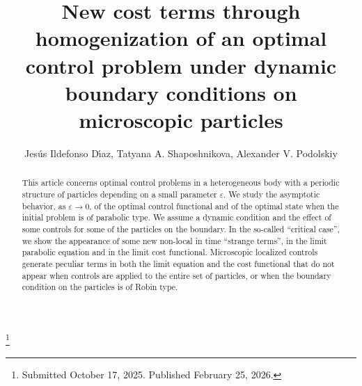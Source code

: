 \documentclass[reqno]{amsart}
\begin{document}
\title[\hfilneg EJDE-2026/18\hfil New cost terms through homogenization]
{New cost terms through homogenization of an optimal control problem
under dynamic boundary conditions on microscopic particles}


\author[J. I. D\'{\i}az, T. A. Shaposhnikova, A. V. Podolskiy \hfil EJDE-2026/18\hfilneg]
{Jes\'us Ildefonso D\'{\i}az, Tatyana A. Shaposhnikova, Alexander V. Podolskiy}

\address{Jes\'us Ildefonso D\'{\i}az \newline
Instituto de Mathematica Interdisciplinar,
Universidad Complutense de Madrid, Spain}

\address{Tatyana A. Shaposhnikova \newline
Lomonosov Moscow State University, Russia}

\address{Alexander V. Podolskiy \newline
Lomonosov Moscow State University, Russia}

\thanks{Submitted October 17, 2025. Published February 25, 2026.}

\begin{abstract}
This article concerns optimal control problems in a heterogeneous body with
a periodic structure of particles depending on a small parameter $\varepsilon$.
We study the asymptotic behavior, as $\varepsilon \to 0$, of the optimal
control functional and of the optimal state when the initial problem is of parabolic type.
We assume a dynamic condition and the effect of some controls for some of 
the particles on the boundary.
In the so-called ``critical case'', we show the appearance of some new
non-local in time ``strange terms'', in the limit parabolic equation
and in the limit cost functional.
Microscopic localized controls generate peculiar terms in both the limit
equation and the cost functional that do not appear when controls are
applied to the entire set of particles, or when the boundary condition on
the particles is of Robin type.
\end{abstract}

\maketitle
{}
\newtheorem{theorem}{Theorem}[section]
\newtheorem{lemma}[theorem]{Lemma}
\newtheorem{remark}[theorem]{Remark}
\allowdisplaybreaks
\end{document}
